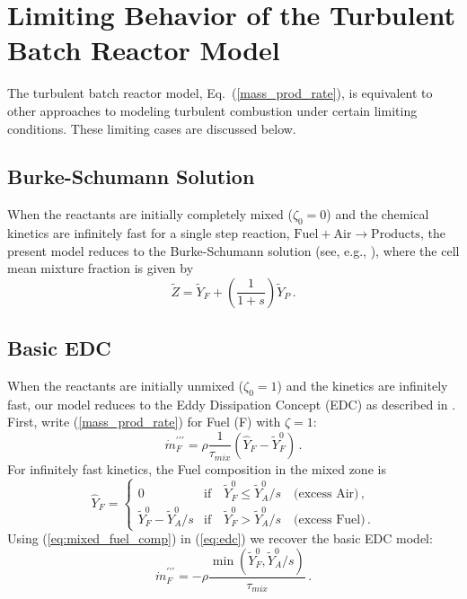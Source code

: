 \chapter{Limiting Behavior of the Turbulent Batch Reactor Model}
\label{app:eddy_dissipation_concept}
\label{source_term}

The turbulent batch reactor model, Eq.~(\ref{mass_prod_rate}), is equivalent to other approaches to modeling turbulent combustion under certain limiting conditions.  These limiting cases are discussed below.

\section{Burke-Schumann Solution}

When the reactants are initially completely mixed ($\zeta_0=0$) and the chemical kinetics are infinitely fast for a single step reaction, $\mbox{Fuel} + \mbox{Air} \rightarrow \mbox{Products}$, the present model reduces to the Burke-Schumann solution (see, e.g., \cite{Turns:1996}), where the cell mean mixture fraction is given by
\begin{equation}
\label{eq:mixture_fraction}
\widetilde{Z} = \widetilde{Y}_{\si{F}} + \left(\frac{1}{1+s}\right) \widetilde{Y}_{\si{P}} \,\mbox{.}
\end{equation}

\section{Basic EDC}

When the reactants are initially unmixed ($\zeta_0=1$) and the kinetics are infinitely fast, our model reduces to the Eddy Dissipation Concept (EDC) as described in \cite{Poinsot:TNC}.  First, write (\ref{mass_prod_rate}) for Fuel (F) with $\zeta = 1$:
\begin{equation}
\label{eq:src_zeta_1}
\dot{m}^{\prime\prime\prime}_{\si{F}} = \rho \frac{1}{\tau_{\si{mix}}} (\hat{Y}_{\si{F}} - \widetilde{Y}_{\si{F}}^0) \,\mbox{.}
\end{equation}
For infinitely fast kinetics, the Fuel composition in the mixed zone is
\begin{equation}
\label{eq:mixed_fuel_comp}
\hat{Y}_{\si{F}} = \left\{ \begin{array}{ll} 0 & \mbox{if} \quad \widetilde{Y}_{\si{F}}^0 \le \widetilde{Y}_{\si{A}}^0/s \quad \mbox{(excess Air)}  \,\mbox{,} \\
\widetilde{Y}_{\si{F}}^0 - \widetilde{Y}_{\si{A}}^0/s & \mbox{if} \quad \widetilde{Y}_{\si{F}}^0 > \widetilde{Y}_{\si{A}}^0/s \quad \mbox{(excess Fuel)}  \,\mbox{.} \end{array} \right.
\end{equation}
Using (\ref{eq:mixed_fuel_comp}) in (\ref{eq:edc}) we recover the basic EDC model:
\begin{equation}
\label{eq:edc_basic}
\dot{m}^{\prime\prime\prime}_{\si{F}} = - \rho \frac{\min(\widetilde{Y}_{\si{F}}^0,\widetilde{Y}_{\si{A}}^0/s)}{\tau_{\si{mix}}} \,\mbox{.}
\end{equation}

